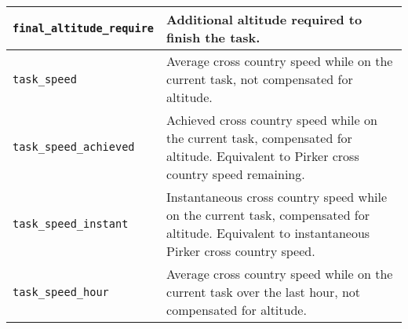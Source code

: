\begin{maxipage}
\begin{tabularx}{1.9\textwidth}{l|X}
\hline

\verb|final_altitude_require| & Additional altitude required to finish
the task. \\

\hline

\verb|task_speed| & Average cross country speed while on the current
task, \newline not compensated for altitude. \\

\hline

\verb|task_speed_achieved| & Achieved cross country speed while on the
current task, \newline compensated for altitude. Equivalent to
Pirker cross country \newline speed remaining. \\

\hline

\verb|task_speed_instant| & Instantaneous cross country speed while
on the current task, \newline  compensated for altitude. Equivalent
to instantaneous Pirker cross \newline country speed. \\

\hline

\verb|task_speed_hour| & Average cross country speed while on the
current task \newline over the last hour, not compensated for altitude. \\

\end{tabularx}
\end{maxipage}

